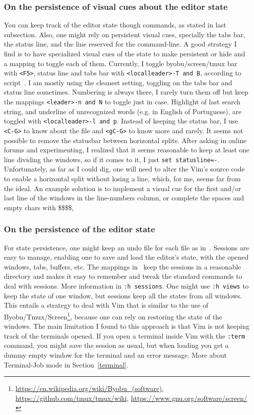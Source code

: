 \documentclass{article}
\newcommand{\ttt}[1] {
	\texttt{<#1>}}
\newcommand{\tttt}[1]{\texttt{#1}}
\begin{document}
\subsubsection{On the persistence of visual cues about the editor state}\label{visual1}
You can keep track of the editor state though commands, as stated
in last subsection.
Also, one might rely on persistent visual
cues, specially the tabs bar, the status line, and the line
reserved for the command-line.
A good strategy I find is to have specialized visual cues of the state to make persistent or hide
and a mapping to toggle each of them.
Currently, I toggle byobu/screen/tmux bar with \ttt{F5},
status line and tabs bar with \tttt{<localleader>-T and B}, according to script~\cite{vimrc}.
I am mostly using the cleanest setting, toggling on the tabs bar and status line sometimes.
Numbering is always there, I rarely turn them off but keep the mappings \tttt{<leader>-n and N} to toggle just in case.
Highlight of last search string, and underline of unrecognized words (e.g. in English of Portuguese), are toggled with \tttt{<localleader>-l and p}.
Instead of keeping the status bar, I use \ttt{C-G} to know about the
file and \ttt{gC-G} to know more and rarely.
It seems not possible to remove the statusbar between horizontal splits.
After asking in online forums and experimenting, I realized that it seems
reasonable to keep at least one line dividing the windows, so
if it comes to it, I just \tttt{set statusline=-}.
Unfortunately, as far as I could dig, one will need to alter
the Vim's source code to enable a horizontal split without losing a line,
which, for me, seems far from the ideal.
An example solution is to implement a visual cue for the
first and/or last line of the windows in the line-numbers
column, or complete the spaces and empty chars with \$\$\$\$,

\subsubsection{On the persistence of the editor state}
For state persistence, one might keep an undo file for each file as
in~\cite{vimrc}.
Sessions are easy to manage, enabling one to save and load the
editor's state, with the opened windows, tabs, buffers, etc.
The mappings in~\cite{vimrc} keep the sessions
in a reasonable directory and makes it easy to remember and tweak
the standard commands to deal with sessions.
More information in \tttt{:h sessions}.
One might use \tttt{:h views} to keep the state of one window,
but sessions keep all the states from all windows.
This entails a strategy to deal with Vim that is similar to
the use of
Byobu/Tmux/Screen\footnote{\url{https://en.wikipedia.org/wiki/Byobu_(software)},
\url{https://github.com/tmux/tmux/wiki},
\url{https://www.gnu.org/software/screen/}},
because one can rely on restoring the state of the windows.
The main limitation I found to this approach is that
Vim is not keeping track of the terminals opened.
If you open a terminal inside Vim with the \tttt{:term}
command, you might save the session as usual, but when loading
you get a dummy empty window for the terminal and an error message.
More about Terminal-Job mode in Section~\ref{terminal}.
\end{document}
